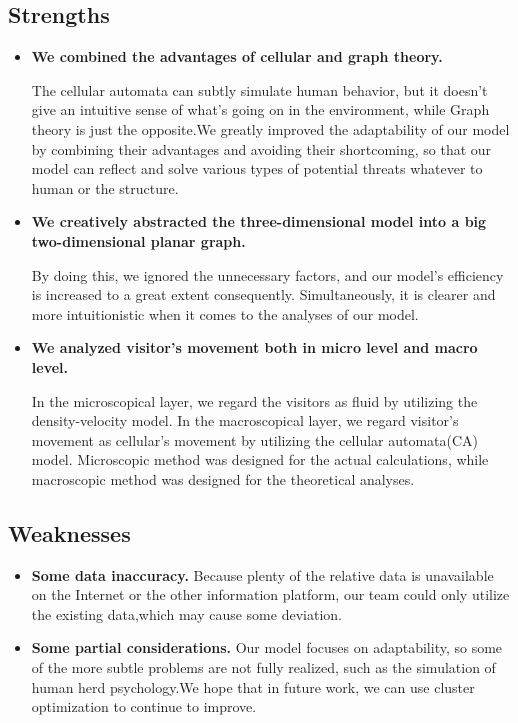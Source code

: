 \documentclass[12pt]{article}
\begin{document}
\subsection{Strengths}
\begin{itemize}
	\item \textbf{We combined the advantages of cellular 
	 and graph theory.}
	
	The cellular automata can subtly simulate human behavior, but it doesn't give an intuitive sense of what's going on in the environment, while Graph theory is just the opposite.We greatly improved the adaptability of our model by combining their advantages and avoiding their shortcoming, so that our model can reflect and solve various types of potential threats whatever to human or the structure.
	
	\item \textbf{We creatively abstracted the three-dimensional model into a big two-dimensional planar graph.}
	
	By doing this, we ignored the unnecessary factors, and our model's efficiency is increased to a great extent consequently. Simultaneously, it is clearer and more intuitionistic when it comes to the analyses of our model.  
	
	
	\item \textbf{We analyzed visitor's movement both in micro level and macro level.}
	
	In the microscopical layer, we regard the visitors as fluid by 
	utilizing the density-velocity model. In the macroscopical layer, 
	we regard visitor's movement as cellular's movement by utilizing 
	the cellular automata(CA) model. Microscopic method was designed 
	for the actual calculations, while macroscopic method was 
	designed for the theoretical analyses.  
	
\end{itemize}

\subsection{Weaknesses}
\begin{itemize}
	\item \textbf{Some data inaccuracy.}
	Because plenty of the relative data is unavailable on the Internet or the other information platform, our team could only utilize the existing data,which may cause some deviation.
	
	\item \textbf{Some partial considerations.}
	Our model focuses on adaptability, so some of the more subtle problems are not fully realized, such as the simulation of human herd psychology.We hope that in future work, we can use cluster optimization to continue to improve.
	 
	
 \end{itemize}
\end{document}
